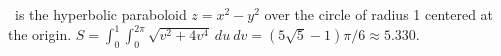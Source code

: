 {\surfaceS\ is the hyperbolic paraboloid $z=x^2-y^2$ over the circle of radius 1 centered at the origin.
}
{$S =\int_0^1\int_{0}^{2\pi}\sqrt{v^2+4v^4}\ du\ dv = (5\sqrt{5}-1)\pi/6 \approx 5.330$.
}
